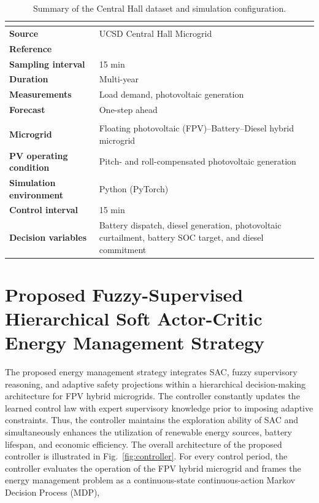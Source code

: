 \documentclass[journal]{IEEEtran}
\begin{document}
\begin{table}[!ht]
\centering
\caption{Summary of the Central Hall dataset and simulation configuration.}
\label{tab:dataset}
\renewcommand{\arraystretch}{1.15}

\begin{tabularx}{\columnwidth}{>{\bfseries}l X}
\toprule
\multicolumn{2}{c}{\textbf{Dataset}}\\
\midrule
Source & UCSD Central Hall Microgrid \\
Reference & \cite{silwal2021opensource} \\
Sampling interval & 15 min \\
Duration & Multi-year \\
Measurements & Load demand, photovoltaic generation \\
Forecast & One-step ahead \\
\midrule
\multicolumn{2}{c}{\textbf{Simulation Configuration}}\\
\midrule
Microgrid & Floating photovoltaic (FPV)--Battery--Diesel hybrid microgrid \\
PV operating condition & Pitch- and roll-compensated photovoltaic generation \\
Simulation environment & Python (PyTorch) \\
Control interval & 15 min \\
Decision variables & Battery dispatch, diesel generation, photovoltaic curtailment, battery SOC target, and diesel commitment \\
\bottomrule
\end{tabularx}
\end{table}

\section{Proposed Fuzzy-Supervised Hierarchical Soft Actor-Critic Energy Management Strategy}
The proposed energy management strategy integrates SAC, fuzzy supervisory reasoning, and adaptive safety projections within a hierarchical decision-making architecture for FPV hybrid microgrids. The controller constantly updates the learned control law with expert supervisory knowledge prior to imposing adaptive constraints. Thus, the controller maintains the exploration ability of SAC and simultaneously enhances the utilization of renewable energy sources, battery lifespan, and economic efficiency. The overall architecture of the proposed controller is illustrated in Fig.~\ref{fig:controller}. For every control period, the controller evaluates the operation of the FPV hybrid microgrid and frames the energy management problem as a continuous-state continuous-action Markov Decision Process (MDP),
\end{document}
